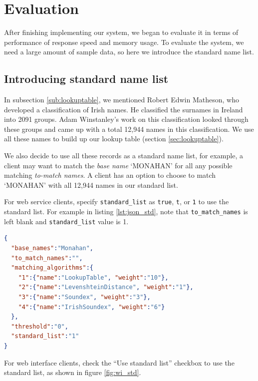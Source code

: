 \chapter{Evaluation}
\label{ch:evaluation}

After finishing implementing our system, we began to evaluate it
in terms of performance of response speed and memory usage. To evaluate
the system, we need a large amount of sample data, so here we
introduce the standard name list.

\section{Introducing standard name list}
\label{sec:stdname}

In subsection \ref{sub:lookuptable}, we mentioned Robert Edwin Matheson,
who developed a classification of Irish names. He classified
the surnames in Ireland into 2091 groups. Adam Winstanley's work
on this classification \cite[]{adamw} looked through these groups
and came up with a total 12,944 names in this classification.
We use all these names to build up our lookup table (section \ref{sec:lookuptable}).

We also decide to use all these records as a standard name list,
for example, a client may want to match the \emph{base name} `MONAHAN'
for all any possible matching \emph{to-match names}. A client has
an option to choose to match `MONAHAN' with all 12,944 names in
our standard list.

For web service clients, specify \texttt{standard\_list} as
\texttt{true}, \texttt{t}, or \texttt{1} to use the standard list.
For example in listing \ref{lst:json_std}, note that
\texttt{to\_match\_names} is left blank and \texttt{standard\_list} value is 1.

\begin{minipage}{\linewidth}
  \begin{lstlisting}[language={json}, label={lst:json_std}, caption={Sample \texttt{JSON} with a standard name list option.}]
{
  "base_names":"Monahan",
  "to_match_names":"",
  "matching_algorithms":{
    "1":{"name":"LookupTable", "weight":"10"},
    "2":{"name":"LevenshteinDistance", "weight":"1"},
    "3":{"name":"Soundex", "weight":"3"},
    "4":{"name":"IrishSoundex", "weight":"6"}
  },
  "threshold":"0",
  "standard_list":"1"
}
\end{lstlisting}
\end{minipage}

For web interface clients, check the ``Use standard list'' checkbox
to use the standard list, as shown in figure \ref{fig:wi_std}.

